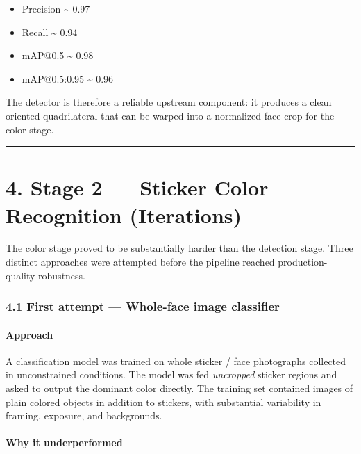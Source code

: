 \documentclass[
  11pt,
  a4paper,
]{article}
\providecommand{\tightlist}{%
  \setlength{\itemsep}{0pt}\setlength{\parskip}{0pt}}
\begin{document}
\begin{itemize}
\tightlist
\item
  Precision \textasciitilde{} 0.97
\item
  Recall \textasciitilde{} 0.94
\item
  mAP@0.5 \textasciitilde{} 0.98
\item
  mAP@0.5:0.95 \textasciitilde{} 0.96
\end{itemize}

The detector is therefore a reliable upstream component: it produces a
clean oriented quadrilateral that can be warped into a normalized face
crop for the color stage.

\begin{center}\rule{0.5\linewidth}{0.5pt}\end{center}

\section{4. Stage 2 --- Sticker Color Recognition
(Iterations)}\label{stage-2-sticker-color-recognition-iterations}

The color stage proved to be substantially harder than the detection
stage. Three distinct approaches were attempted before the pipeline
reached production-quality robustness.

\subsubsection{4.1 First attempt --- Whole-face image
classifier}\label{first-attempt-whole-face-image-classifier}

\paragraph{Approach}\label{approach-1}

A classification model was trained on whole sticker / face photographs
collected in unconstrained conditions. The model was fed
\emph{uncropped} sticker regions and asked to output the dominant color
directly. The training set contained images of plain colored objects in
addition to stickers, with substantial variability in framing, exposure,
and backgrounds.

\paragraph{Why it underperformed}\label{why-it-underperformed}
\end{document}
